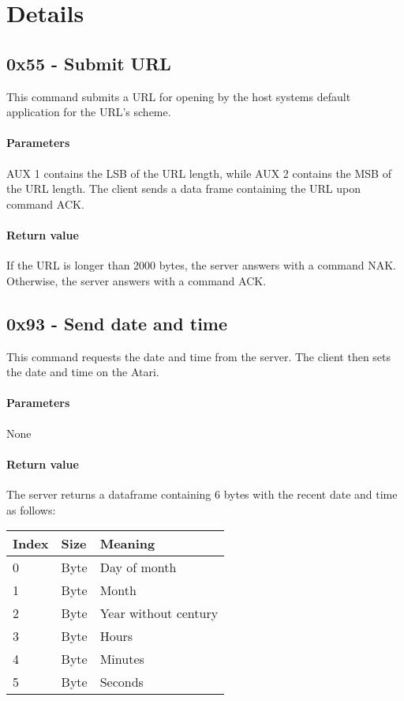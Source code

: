\documentclass[10pt]{article}
\begin{document}
\section{Details}
\subsection{0x55 - Submit URL }
This command submits a URL for opening by the host systems default application for the URL's scheme.

\paragraph{Parameters}
AUX 1 contains the LSB of the URL length, while AUX 2 contains the MSB of the URL length.
The client sends a data frame containing the URL upon command ACK.

\paragraph{Return value}
If the URL is longer than 2000 bytes, the server answers with a command NAK.
Otherwise, the server answers with a command ACK.

\subsection{0x93 - Send date and time}
This command requests the date and time from the server.
The client then sets the date and time on the Atari.

\paragraph{Parameters}
None

\paragraph{Return value}
The server returns a dataframe containing 6 bytes with the recent date and time as follows:\\

\begin{tabular}{l|l|l}
Index & Size & Meaning \\ \hline
0 & Byte & Day of month \\
1 & Byte & Month \\
2 & Byte & Year without century \\
3 & Byte & Hours \\
4 & Byte & Minutes \\
5 & Byte & Seconds
\end{tabular}


\end{document}
